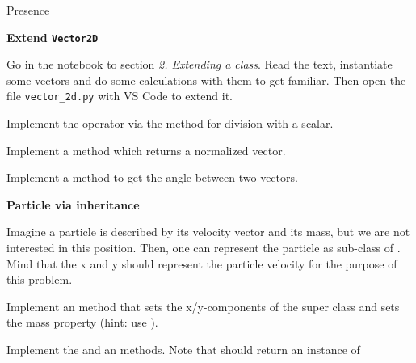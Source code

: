 \documentclass[a4paper, draft=False]{scrartcl}
\begin{document}
\begin{exam}[Presence]{Presence}
\begin{instructions}
\begin{problem*}
\begin{parts}
      \end{parts}
    \end{problem*}
    \begin{problem*}\textbf{Extend \texttt{Vector2D}}

      Go in the notebook to section \emph{2. Extending a class}. Read the text,
      instantiate some vectors and do some calculations with them to get
      familiar. Then open the file \texttt{vector\_2d.py} with VS Code to extend
      it.

      \begin{parts}
      \item Implement the \py{/} operator via the  method for
        division with a scalar.
      \item Implement a  method which returns a normalized vector.
      \item Implement a method  to get the angle between two vectors.
      \end{parts}
    \end{problem*}

    \begin{problem*}\textbf{Particle via inheritance}

        Imagine a particle is described by its velocity vector and its mass, but
        we are not interested in this position. Then, one can represent the
        particle as sub-class of . Mind that the x and y
        should represent the particle velocity for the purpose of this problem.

    \begin{parts}
      \item Implement an  method that sets the
        x/y-components of the super class and sets the mass property
        (hint: use ).
      \item Implement the  and an  methods. Note that
         should return an instance of 
    \end{parts}
    \end{problem*}
  \end{instructions}
\end{exam}
\end{document}

